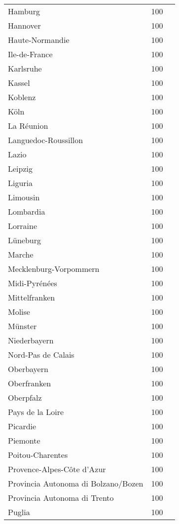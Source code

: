 \begin{table}[H]
\begin{tabularx}{\textwidth}{Xcc}
            Hamburg & 100 \\
            Hannover & 100 \\
            Haute-Normandie  & 100 \\
            Ile-de-France & 100 \\
            Karlsruhe & 100 \\
            Kassel & 100 \\
            Koblenz & 100 \\
            Köln & 100 \\
            La Réunion  & 100 \\
            Languedoc-Roussillon & 100 \\
            Lazio & 100 \\
            Leipzig & 100 \\
            Liguria & 100 \\
            Limousin & 100 \\
            Lombardia & 100 \\
            Lorraine & 100 \\
            Lüneburg & 100 \\
            Marche & 100 \\
            Mecklenburg-Vorpommern & 100 \\
            Midi-Pyrénées & 100 \\
            Mittelfranken & 100 \\
            Molise & 100 \\
            Münster & 100 \\
            Niederbayern & 100 \\
            Nord-Pas de Calais & 100 \\
            Oberbayern & 100 \\
            Oberfranken & 100 \\
            Oberpfalz & 100 \\
            Pays de la Loire & 100 \\
            Picardie & 100 \\
            Piemonte & 100 \\
            Poitou-Charentes & 100 \\
            Provence-Alpes-Côte d’Azur & 100 \\
            Provincia Autonoma di Bolzano/Bozen & 100 \\
            Provincia Autonoma di Trento & 100 \\
            Puglia & 100 \\

\end{tabularx}
\end{table}
